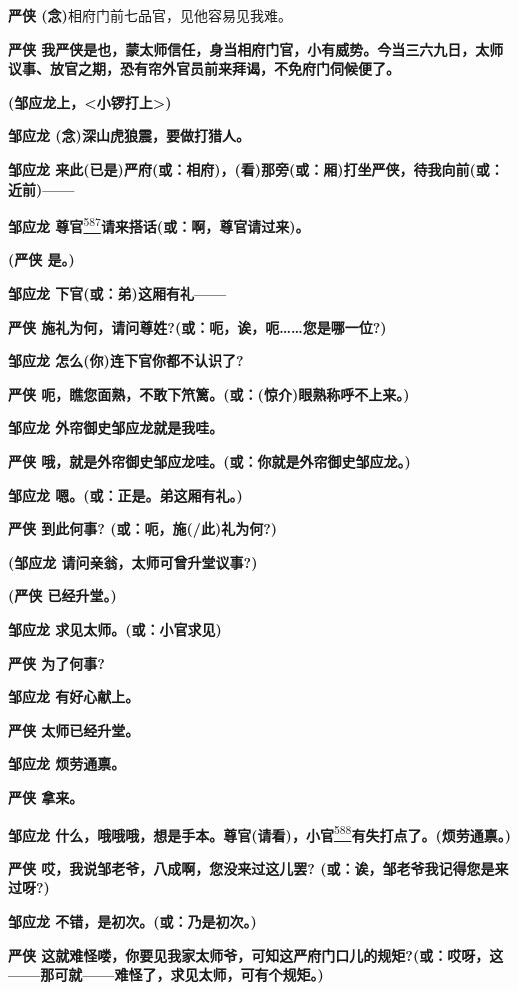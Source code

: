 \textbf{严侠 (念)}相府门前七品官，见他容易见我难。

\textbf{严侠
我严侠是也，蒙太师信任，身当相府门官，小有威势。今当三六九日，太师议事、放官之期，恐有帘外官员前来拜谒，不免府门伺候便了。}

\textbf{(邹应龙上，\textless{}小锣打上\textgreater{})}

\textbf{邹应龙 (念)深山虎狼震，要做打猎人。}

\textbf{邹应龙
来此(已是)严府(或：相府)，(看)那旁(或：厢)打坐严侠，待我向前(或：近前)------}

\textbf{邹应龙
尊官}\protect\hyperlink{fn587}{\textsuperscript{587}}\textbf{请来搭话(或：啊，尊官请过来)。}

\textbf{(严侠 是。)}

\textbf{邹应龙 下官(或：弟)这厢有礼------}

\textbf{严侠
施礼为何，请问尊姓?(或：呃，诶，呃\ldots{}\ldots{}您是哪一位?)}

\textbf{邹应龙 怎么(你)连下官你都不认识了?}

\textbf{严侠 呃，瞧您面熟，不敢下笊篱。(或：(惊介)眼熟称呼不上来。)}

\textbf{邹应龙 外帘御史邹应龙就是我哇。}

\textbf{严侠 哦，就是外帘御史邹应龙哇。(或：你就是外帘御史邹应龙。)}

\textbf{邹应龙 嗯。(或：正是。弟这厢有礼。)}

\textbf{严侠 到此何事? (或：呃，施(/此)礼为何?)}

\textbf{(邹应龙 请问亲翁，太师可曾升堂议事?)}

\textbf{(严侠 已经升堂。)}

\textbf{邹应龙 求见太师。(或：小官求见)}

\textbf{严侠 为了何事?}

\textbf{邹应龙 有好心献上。}

\textbf{严侠 太师已经升堂。}

\textbf{邹应龙 烦劳通禀。}

\textbf{严侠 拿来。}

\textbf{邹应龙
什么，哦哦哦，想是手本。尊官(请看)，小官}\protect\hyperlink{fn588}{\textsuperscript{588}}\textbf{有失打点了。(烦劳通禀。)}

\textbf{严侠 哎，我说邹老爷，八成啊，您没来过这儿罢?
(或：诶，邹老爷我记得您是来过呀?)}

\textbf{邹应龙 不错，是初次。(或：乃是初次。)}

\textbf{严侠
这就难怪喽，你要见我家太师爷，可知这严府门口儿的规矩?(或：哎呀，这------那可就------难怪了，求见太师，可有个规矩。)}

